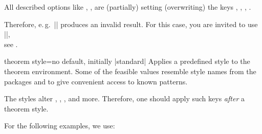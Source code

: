 \bigskip
\begin{marker}
  All described options like , ,
   are (partially) setting (overwriting) the
  keys , ,
  , .\par
  Therefore, e.\,g.\ ||
  produces an invalid result. For this case, you are invited to use\\
  ||,\\
  see .
\end{marker}


\clearpage
\begin{docTcbKey}{theorem style}{=}{no default, initially |standard|}
Applies a predefined style  to the theorem environment. Some of
the feasible  values resemble style names from the packages 
and  to give convenient access to known patterns.
\begin{marker}
The styles alter , ,
, and more. Therefore, one should apply such
keys \emph{after} a theorem style.
\end{marker}

For the following examples, we use:


\end{docTcbKey}
